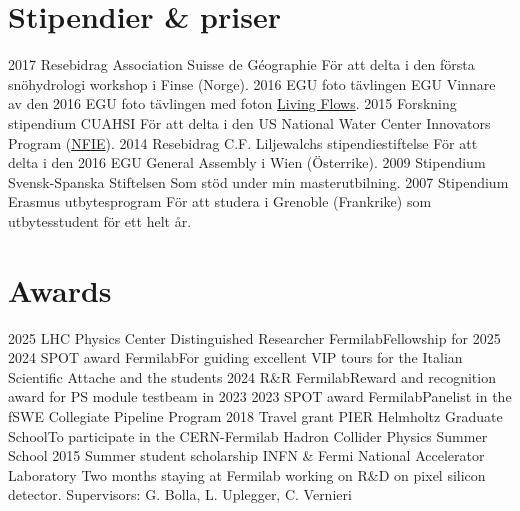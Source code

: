 \ifswedish
  \section{Stipendier \& priser}
    \position
      {2017}
      {Resebidrag}
      {Association Suisse de Géographie}
      {För att delta i den första snöhydrologi workshop i Finse (Norge).}
    \position
      {2016}
      {EGU foto tävlingen}
      {EGU}
      {Vinnare av den 2016 EGU foto tävlingen med foton \href{https://blogs.egu.eu/geolog/2016/08/29/imaggeo-on-mondays-living-flows/}{Living Flows}.}
    \position
      {2015}
      {Forskning stipendium}
      {CUAHSI}
      {För att delta i den US National Water Center Innovators Program  (\href{https://www.cuahsi.org/education/summerinstitute/}{NFIE}).}
    \position
      {2014}
      {Resebidrag}
      {C.F. Liljewalchs stipendiestiftelse}
      {För att delta i den 2016 EGU General Assembly i Wien (Österrike).}
    \position
      {2009}
      {Stipendium}
      {Svensk-Spanska Stiftelsen}
      {Som stöd under min masterutbilning.}
    \position
      {2007}
      {Stipendium}
      {Erasmus utbytesprogram}
      {För att studera i Grenoble (Frankrike) som utbytesstudent för ett helt år.}
\else
  \section{Awards}
    \ifacademic
    \position  
        {2025}
        {LHC Physics Center Distinguished Researcher}
        {Fermilab}{Fellowship for 2025} 
    \position  
        {2024}
        {SPOT award}
        {Fermilab}{For guiding excellent VIP tours for the Italian Scientific Attache and the students} 
     \position  
        {2024}
        {R\&R}
        {Fermilab}{Reward and recognition award for PS module testbeam in 2023} 
      \position  
        {2023}
        {SPOT award}
        {Fermilab}{Panelist in the fSWE Collegiate Pipeline Program} 
      \position  
        {2018}
        {Travel grant}
        {PIER Helmholtz Graduate School}{To participate in the CERN-Fermilab Hadron Collider Physics Summer School}      
       \position
        {2015}
        {Summer student scholarship}
        {INFN \& Fermi National Accelerator Laboratory} 
        {Two months staying at Fermilab working on R\&D on pixel silicon detector. \newline Supervisors: G. Bolla, L. Uplegger, C. Vernieri}
    \fi
\fi
